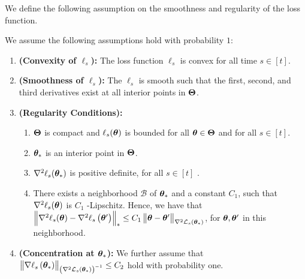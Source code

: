 
We define the following assumption on the smoothness and regularity of the loss function. 
\begin{assumption}
\label{assm:thm}
We assume the following assumptions hold with probability $1$:
\begin{enumerate}
    \item \textbf{(Convexity of $\ell_{s}$):} The loss function $\ell_{s}$ is convex for all time $s\in[t]$.
    \item \textbf{(Smoothness of $\ell_{s}$):} The $\ell_{s}$ is smooth such that the first, second, and third derivatives exist at all interior points in $\bm{\Theta}$.
    \item \textbf{(Regularity Conditions):} \begin{enumerate}
        \item $\bm{\Theta}$ is compact and $\ell_{s}(\bm{\theta})$ is bounded for all $\bm{\theta}\in\bm{\Theta}$ and for all $s\in[t]$.
        \item $\bm{\theta}_*$ is an interior point in $\bm{\Theta}$.
        \item $\nabla^2 \ell_{s}(\bm{\theta}_*)$ is positive definite, for all $s\in[t]$ .
        \item There exists a neighborhood $\mathcal{B}$ of $\bm{\theta}_*$ and a constant $C_{1}$, such that $\nabla^{2} \ell_{s}(\bm{\theta})$ is $C_{1}$ -Lipschitz. Hence, we have that $\left\|\nabla^{2} \ell_{s}(\bm{\theta})-\nabla^{2} \ell_{s}\left(\bm{\theta}^{\prime}\right)\right\|_{*} \leq C_{1}\left\|\bm{\theta}-\bm{\theta}^{\prime}\right\|_{\nabla^{2} {\cal L}_s\left(\bm{\theta}_{*}\right)}$, for $\bm{\theta}, \bm{\theta}^{\prime}$ in this neighborhood.
    \end{enumerate}
    \item \textbf{(Concentration at $\bm{\theta}_{*}$):} We further assume that $\left\|\nabla \ell_{s}\left(\bm{\theta}_{*}\right)\right\|_{\left(\nabla^{2} {\cal L}_s\left(\bm{\theta}_{*}\right)\right)^{-1}} \leq C_{2}$ hold with probability one.
\end{enumerate}
\end{assumption}


